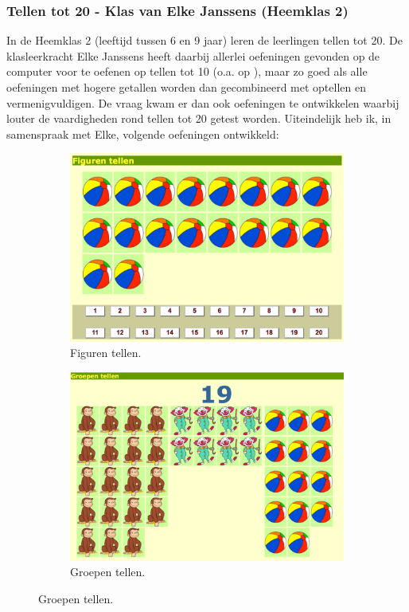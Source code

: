 \documentclass[a4paper,11pt]{article}
\theoremstyle{definition}
\begin{document}
\subsubsection{Tellen tot 20 - Klas van Elke Janssens (Heemklas 2)}
In de Heemklas 2 (leeftijd tussen 6 en 9 jaar) leren de leerlingen tellen tot 20. De klasleerkracht Elke 
Janssens heeft daarbij allerlei oefeningen gevonden op de computer voor te 
oefenen op tellen tot 10 (o.a. op ), maar zo goed als alle oefeningen met hogere getallen worden dan gecombineerd met optellen en vermenigvuldigen. 
De vraag kwam er dan ook oefeningen te ontwikkelen waarbij louter de vaardigheden  
rond tellen tot 20 getest worden. Uiteindelijk heb ik, in samenspraak met Elke, 
volgende oefeningen ontwikkeld:
\begin{figure}[h!]
        \centering
        \begin{subfigure}{.5\textwidth}
          \centering
                \includegraphics[scale=0.15]{20_1.jpg}
                \caption{Figuren tellen.}
                \label{20_1}
        \end{subfigure}%
        \begin{subfigure}{.5\textwidth}
           \centering
                \includegraphics[scale=0.15]{20_2.jpg}
                \caption{Groepen tellen.}
                \label{20_2}
        \end{subfigure}
     

\end{figure}
\end{document}
